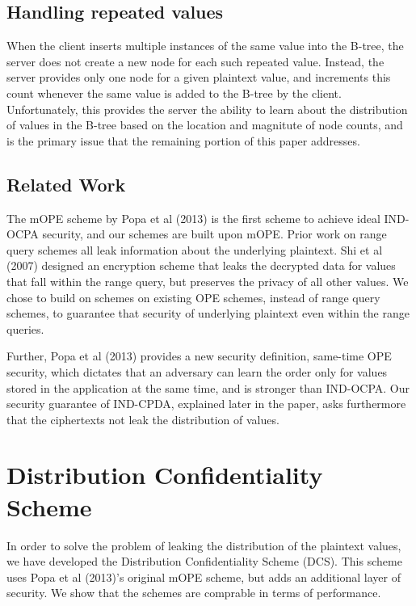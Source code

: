 \documentclass[12pt]{article}
\begin{document}
\subsection{Handling repeated values}

When the client inserts multiple instances of the same value into the B-tree, the server does not create a new node for each such repeated value. Instead, the server provides only one node for a given plaintext value, and increments this count whenever the same value is added to the B-tree by the client. Unfortunately, this provides the server the ability to learn about the distribution of values in the B-tree based on the location and magnitute of node counts, and is the primary issue that the remaining portion of this paper addresses. 

\subsection{Related Work}

The mOPE scheme by Popa et al (2013) is the first scheme to achieve ideal IND-OCPA security, and our schemes are built upon mOPE. Prior work on range query schemes all leak information about the underlying plaintext. Shi et al (2007) designed an encryption scheme that leaks the decrypted data for values that fall within the range query, but preserves the privacy of all other values. We chose to build on schemes on existing OPE schemes, instead of range query schemes, to guarantee that security of underlying plaintext even within the range queries.

Further, Popa et al (2013) provides a new security definition, same-time OPE security, which dictates that an adversary can learn the order only for values stored in the application at the same time, and is stronger than IND-OCPA. Our security guarantee of IND-CPDA, explained later in the paper, asks furthermore that the ciphertexts not leak the distribution of values. 

\section{Distribution Confidentiality Scheme}

In order to solve the problem of leaking the distribution of the plaintext values, we have developed the Distribution Confidentiality Scheme (DCS). This scheme uses Popa et al (2013)'s original mOPE scheme, but adds an additional layer of security. We show that the schemes are comprable in terms of performance.
\end{document}

